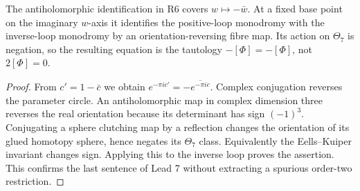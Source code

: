 \begin{proposition}
The antiholomorphic identification in R6 covers
$w\mapsto-\bar w$. At a fixed base point on the imaginary
$w$-axis it identifies the positive-loop monodromy with the
inverse-loop monodromy by an orientation-reversing fibre map.
Its action on $\Theta_7$ is negation, so the resulting equation is
the tautology $-[\Phi]=-[\Phi]$, not $2[\Phi]=0$.
\end{proposition}

\begin{proof}
From $c'=1-\bar c$ we obtain
$e^{-\pi ic'}=-\overline{e^{-\pi ic}}$.
Complex conjugation reverses the parameter circle. An
antiholomorphic map in complex dimension three reverses the real
orientation because its determinant has sign $(-1)^3$.
Conjugating a sphere clutching map by a reflection changes the
orientation of its glued homotopy sphere, hence negates its
$\Theta_7$ class. Equivalently the Eells--Kuiper invariant changes
sign. Applying this to the inverse loop proves the assertion.
This confirms the last sentence of Lead 7 without extracting a
spurious order-two restriction.
\end{proof}

